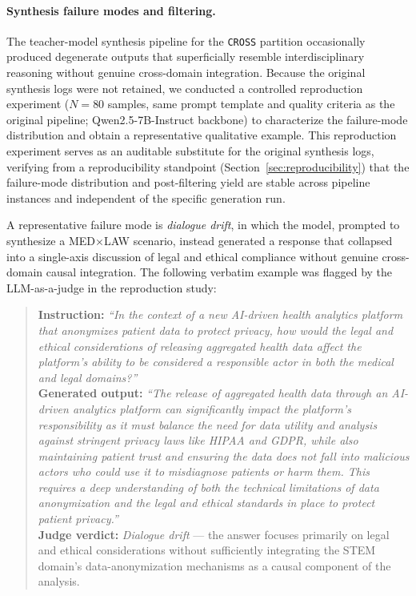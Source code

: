 \documentclass[a4paper,fleql]{cas-sc}
\begin{document}
\paragraph{Synthesis failure modes and filtering.}
The teacher-model synthesis pipeline for the \texttt{CROSS} partition
occasionally produced degenerate outputs that superficially resemble
interdisciplinary reasoning without genuine cross-domain integration.
Because the original synthesis logs were not retained, we conducted a
controlled reproduction experiment ($N{=}80$ samples, same prompt template
and quality criteria as the original pipeline; Qwen2.5-7B-Instruct
backbone) to characterize the failure-mode distribution and obtain a
representative qualitative example. This reproduction experiment serves as
an auditable substitute for the original synthesis logs, verifying from a
reproducibility standpoint (Section~\ref{sec:reproducibility}) that the
failure-mode distribution and post-filtering yield are stable across
pipeline instances and independent of the specific generation run.

A representative failure mode is \textit{dialogue drift}, in which the
model, prompted to synthesize a \textsc{MED}$\times$\textsc{LAW} scenario,
instead generated a response that collapsed into a single-axis discussion
of legal and ethical compliance without genuine cross-domain causal
integration. The following verbatim example was flagged by the LLM-as-a-judge
in the reproduction study:
\begin{quote}
\small
\textbf{Instruction:} \textit{``In the context of a new AI-driven health
analytics platform that anonymizes patient data to protect privacy, how
would the legal and ethical considerations of releasing aggregated health
data affect the platform's ability to be considered a responsible actor in
both the medical and legal domains?''}\\[4pt]
\textbf{Generated output:} \textit{``The release of aggregated health data
through an AI-driven analytics platform can significantly impact the
platform's responsibility as it must balance the need for data utility and
analysis against stringent privacy laws like HIPAA and GDPR, while also
maintaining patient trust and ensuring the data does not fall into
malicious actors who could use it to misdiagnose patients or harm them.
This requires a deep understanding of both the technical limitations of
data anonymization and the legal and ethical standards in place to protect
patient privacy.''}\\[4pt]
\textbf{Judge verdict:} \textit{Dialogue drift} --- the answer focuses
primarily on legal and ethical considerations without sufficiently
integrating the \textsc{STEM} domain's data-anonymization mechanisms as a
causal component of the analysis.
\end{quote}
\end{document}
